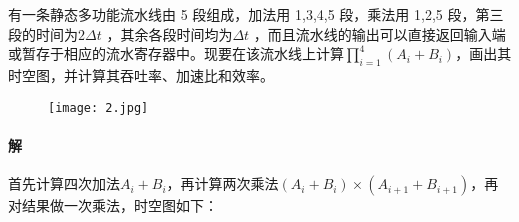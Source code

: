 \documentclass{article}
\begin{document}
\section{}
有一条静态多功能流水线由 5 段组成，加法用 1,3,4,5 段，乘法用 1,2,5 段，第三段的时间为$2\Delta t$ ，其余各段时间均为$\Delta t$ ，而且流水线的输出可以直接返回输入端或暂存于相应的流水寄存器中。现要在该流水线上计算$\displaystyle \prod_{i = 1}^4(A_i + B_i)$，画出其时空图，并计算其吞吐率、加速比和效率。
\begin{figure}[H]
    \centering
    \texttt{[image: 2.jpg]}
\end{figure}

\paragraph{解}
首先计算四次加法$A_i + B_i$，再计算两次乘法$(A_i + B_i) \times (A_{i + 1} + B_{i + 1})$，再对结果做一次乘法，时空图如下：
\end{document}

